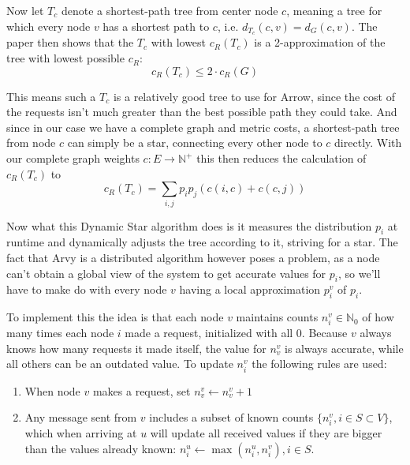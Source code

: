 \documentclass[a4paper, oneside]{discothesis}
\begin{document}
Now let $T_c$ denote a shortest-path tree from center node $c$, meaning a tree for which every node $v$ has a shortest path to $c$, i.e. $d_{T_c}(c,v)=d_G(c,v)$. The paper then shows that the $T_c$ with lowest $c_R(T_c)$ is a 2-approximation of the tree with lowest possible $c_R$:
\begin{equation}
c_R(T_c)\leq 2\cdot c_R(G)
\end{equation}

This means such a $T_c$ is a relatively good tree to use for Arrow, since the cost of the requests isn't much greater than the best possible path they could take. And since in our case we have a complete graph and metric costs, a shortest-path tree from node $c$ can simply be a star, connecting every other node to $c$ directly. With our complete graph weights $c:E\to\mathbb{N}^+$ this then reduces the calculation of $c_R(T_c)$ to
\begin{equation}
\label{dynstarc}
c_R(T_c)=\sum_{i,j}p_ip_j(c(i,c)+c(c,j))
\end{equation}

Now what this Dynamic Star algorithm does is it measures the distribution $p_i$ at runtime and dynamically adjusts the tree according to it, striving for a star. The fact that Arvy is a distributed algorithm however poses a problem, as a node can't obtain a global view of the system to get accurate values for $p_i$, so we'll have to make do with every node $v$ having a local approximation $p_i^v$ of $p_i$.

To implement this the idea is that each node $v$ maintains counts $n_i^v\in\mathbb{N}_0$ of how many times each node $i$ made a request, initialized with all $0$. Because $v$ always knows how many requests it made itself, the value for $n_v^v$ is always accurate, while all others can be an outdated value. To update $n_i^v$ the following rules are used:
\begin{enumerate}
\item When node $v$ makes a request, set $n_v^v\gets n_v^v+1$
\label{rule1}
\item Any message sent from $v$ includes a subset of known counts $\{n_i^v,i\in S\subset V\}$, which when arriving at $u$ will update all received values if they are bigger than the values already known: $n_i^u\gets \max(n_i^u,n_i^v),i\in S$.
\end{enumerate}
\end{document}
